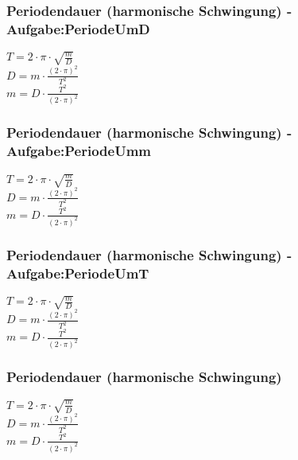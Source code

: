 \subsubsection{Periodendauer (harmonische Schwingung) - Aufgabe:PeriodeUmD} 
\begin{minipage}{0.45\textwidth} 
$ T = 2\cdot \pi \cdot \sqrt{\frac{m}{D}} $\\ 
$ D= m\cdot \frac{(2\cdot \pi )^{2} }{  T^{2} } $\\ 
$ m= D\cdot \frac{ T^{2} }{(2\cdot \pi )^{2} } $\\ 
\end{minipage} 
\begin{minipage}{0.45\textwidth} 
 
\end{minipage} 
\subsubsection{Periodendauer (harmonische Schwingung) - Aufgabe:PeriodeUmm} 
\begin{minipage}{0.45\textwidth} 
$ T = 2\cdot \pi \cdot \sqrt{\frac{m}{D}} $\\ 
$ D= m\cdot \frac{(2\cdot \pi )^{2} }{  T^{2} } $\\ 
$ m= D\cdot \frac{ T^{2} }{(2\cdot \pi )^{2} } $\\ 
\end{minipage} 
\begin{minipage}{0.45\textwidth} 
 
\end{minipage} 
\subsubsection{Periodendauer (harmonische Schwingung) - Aufgabe:PeriodeUmT} 
\begin{minipage}{0.45\textwidth} 
$ T = 2\cdot \pi \cdot \sqrt{\frac{m}{D}} $\\ 
$ D= m\cdot \frac{(2\cdot \pi )^{2} }{  T^{2} } $\\ 
$ m= D\cdot \frac{ T^{2} }{(2\cdot \pi )^{2} } $\\ 
\end{minipage} 
\begin{minipage}{0.45\textwidth} 
 
\end{minipage} 
\subsubsection{Periodendauer (harmonische Schwingung)} 
\begin{minipage}{0.45\textwidth} 
$ T = 2\cdot \pi \cdot \sqrt{\frac{m}{D}} $\\ 
$ D= m\cdot \frac{(2\cdot \pi )^{2} }{  T^{2} } $\\ 
$ m= D\cdot \frac{ T^{2} }{(2\cdot \pi )^{2} } $\\ 
\end{minipage} 
\begin{minipage}{0.45\textwidth} 
 
\end{minipage} 
